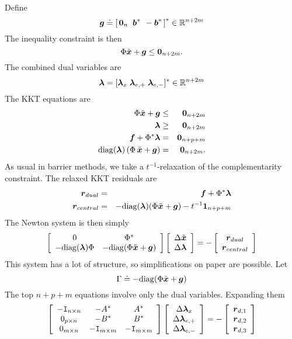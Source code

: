 Define 
\begin{equation}
\boldsymbol{g} \doteq \left[ \, \boldsymbol{0}_n \;\; \boldsymbol{b}^* \;\, -\boldsymbol{b}^* \, \right]^* \in \mathbb R^{n + 2m}
\end{equation}
The inequality constraint is then $$\Phi \tilde {{\boldsymbol{x}}} + \boldsymbol{g} \le \boldsymbol{0}_{n+2m}.$$
The combined dual variables are 
\begin{equation}
\boldsymbol{\lambda} = [ \boldsymbol{\lambda}_{x} \; \boldsymbol{\lambda}_{e,+} \; \boldsymbol{\lambda}_{e,-} ]^* \in \mathbb R^{n+2m}
\end{equation}
The KKT equations are 
\begin{eqnarray}
\Phi \tilde {{\boldsymbol{x}}} + \boldsymbol{g} &\le& \boldsymbol{0}_{n+2m} \\
\boldsymbol{\lambda} &\ge& \boldsymbol{0}_{n+2m} \\
\boldsymbol{f} + \Phi^* \boldsymbol{\lambda} &=& \boldsymbol{0}_{n+p+m} \\
\mathrm{diag}(\boldsymbol{\lambda}) \,( \Phi \, \tilde {{\boldsymbol{x}}} + \boldsymbol{g}) &=& \boldsymbol{0}_{n + 2m}.
\end{eqnarray}
As usual in barrier methods, we take a $t^{-1}$-relaxation of the complementarity constraint. The relaxed KKT residuals are 
\begin{eqnarray}
\boldsymbol{r}_{dual}  &=&  \boldsymbol{f} + \Phi^* \boldsymbol{\lambda} \\
\boldsymbol{r}_{central} &=& -\mathrm{diag}(\boldsymbol{\lambda}) (\Phi \tilde {{\boldsymbol{x}}} + \boldsymbol{g}) - t^{-1} {\boldsymbol{1}}_{n+p+m}
\end{eqnarray}
The Newton system is then simply
\begin{equation}
\left[ \begin{array}{cc} 0 & \Phi^* \\ - \mathrm{diag}(\boldsymbol{\lambda}) \Phi & -\mathrm{diag}(\Phi \tilde {{\boldsymbol{x}}} + \boldsymbol{g}) \end{array} \right] \left[ \begin{array}{c} \Delta \tilde {{\boldsymbol{x}}} \\ \Delta \boldsymbol{\lambda} \end{array} \right] = - \left[ \begin{array}{c} \boldsymbol{r}_{dual} \\ \boldsymbol{r}_{central} \end{array} \right]
\end{equation}
This system has a lot of structure, so simplifications on paper are possible. Let
$$\Gamma \doteq - \mathrm{diag}(\Phi \tilde {{\boldsymbol{x}}} + \boldsymbol{g})$$
The top $n+p+m$ equations involve only the dual variables. Expanding them
\begin{equation} \label{eqn:d-lambda-only}
\left[ \begin{array}{ccc} -\mathtt{I}_{n\times n} &  -A^* & A^* \\  0_{p \times n} & -B^* & B^* \\ 
0_{m \times n} & -\mathtt{I}_{m \times m} & -\mathtt{I}_{m \times m} \end{array} \right] \left[ \begin{array}{c} \Delta \boldsymbol{\lambda}_{x} \\ \Delta \boldsymbol{\lambda}_{e,+} \\ \Delta \boldsymbol{\lambda}_{e,-} \end{array} \right] = - \left[ \begin{array}{c} \boldsymbol{r}_{d,1} \\ \boldsymbol{r}_{d,2} \\ \boldsymbol{r}_{d,3} \end{array} \right]
\end{equation}
